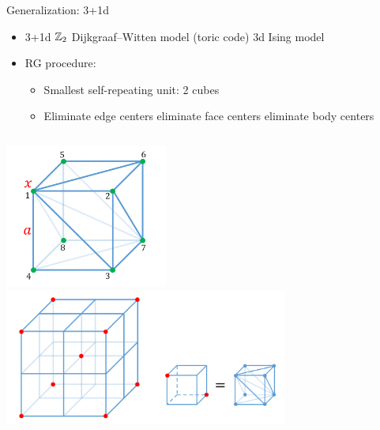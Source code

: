 \documentclass{fdubeamer}
\begin{document}
\begin{frame}{Generalization: 3+1d}

\begin{itemize}
  \item 3+1d $\mathbb{Z}_2$ Dijkgraaf--Witten model (toric code) \textrightarrow{} 3d Ising model
  \item RG procedure:

    \begin{itemize}
      \item Smallest self-repeating unit: 2 cubes
      \item Eliminate edge centers \textrightarrow{} eliminate face centers \textrightarrow{} eliminate body centers
    \end{itemize}
\end{itemize}

\begin{columns}[c]


    \centering
    \includegraphics[width=0.4\textwidth]{images/holographic/3+1d-cube-1.png} \\[1ex]
    \includegraphics[width=0.7\textwidth]{images/holographic/3+1d-cube-2.png}
    \vspace{-1em}



\end{columns}
\end{frame}
\end{document}
